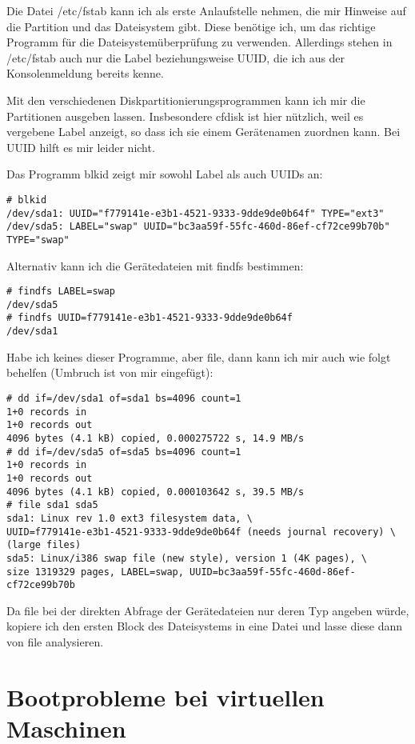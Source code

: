 Die Datei /etc/fstab kann ich als erste Anlaufstelle nehmen, die mir Hinweise
auf die Partition und das Dateisystem gibt. Diese benötige ich, um das
richtige Programm für die Dateisystemüberprüfung zu verwenden. Allerdings
stehen in /etc/fstab auch nur die Label beziehungsweise UUID, die ich aus der
Konsolenmeldung bereits kenne.

Mit den verschiedenen Diskpartitionierungsprogrammen kann ich mir die
Partitionen ausgeben lassen. Insbesondere cfdisk ist hier nützlich, weil es
vergebene Label anzeigt, so dass ich sie einem Gerätenamen zuordnen kann. Bei
UUID hilft es mir leider nicht.

Das Programm blkid zeigt mir sowohl Label als auch UUIDs an:
\begin{verbatim}
# blkid
/dev/sda1: UUID="f779141e-e3b1-4521-9333-9dde9de0b64f" TYPE="ext3" 
/dev/sda5: LABEL="swap" UUID="bc3aa59f-55fc-460d-86ef-cf72ce99b70b" TYPE="swap" 
\end{verbatim}

Alternativ kann ich die Gerätedateien mit findfs bestimmen:
\begin{verbatim}
# findfs LABEL=swap
/dev/sda5
# findfs UUID=f779141e-e3b1-4521-9333-9dde9de0b64f
/dev/sda1
\end{verbatim}

Habe ich keines dieser Programme, aber file, dann kann ich mir auch wie folgt
behelfen (Umbruch ist von mir eingefügt):
\begin{verbatim}
# dd if=/dev/sda1 of=sda1 bs=4096 count=1
1+0 records in
1+0 records out
4096 bytes (4.1 kB) copied, 0.000275722 s, 14.9 MB/s
# dd if=/dev/sda5 of=sda5 bs=4096 count=1
1+0 records in
1+0 records out
4096 bytes (4.1 kB) copied, 0.000103642 s, 39.5 MB/s
# file sda1 sda5
sda1: Linux rev 1.0 ext3 filesystem data, \
UUID=f779141e-e3b1-4521-9333-9dde9de0b64f (needs journal recovery) \
(large files)
sda5: Linux/i386 swap file (new style), version 1 (4K pages), \
size 1319329 pages, LABEL=swap, UUID=bc3aa59f-55fc-460d-86ef-cf72ce99b70b
\end{verbatim}

Da file bei der direkten Abfrage der Gerätedateien nur deren Typ angeben
würde, kopiere ich den ersten Block des Dateisystems in eine Datei und lasse
diese dann von file analysieren.

\section{Bootprobleme bei virtuellen Maschinen}
\label{sec:lokal-bootprobleme-vm}


